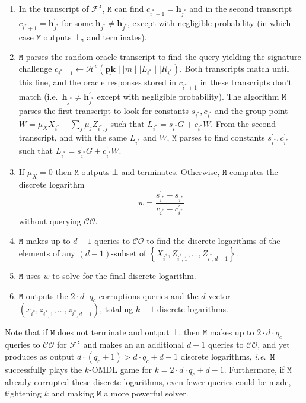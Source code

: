 \documentclass{mrl}
\theoremstyle{plain}
\theoremstyle{definition}
\begin{document}
\begin{enumerate}
\item In the transcript of $\mathcal{F}^{\texttt{A}}$, $\texttt{M}$ can find $c_{i^*+1} = \textbf{h}_{j^*}$ and in the second transcript $c_{i^*+1} = \textbf{h}^\prime_{j^*}$ for some $\textbf{h}_{j^*} \neq \textbf{h}^\prime_{j^*}$, except with negligible probability (in which case $\texttt{M}$ outputs $\bot_{\texttt{M}}$ and terminates).

\item $\texttt{M}$ parses the random oracle transcript to find the query yielding the signature challenge  $c_{i^*+1} \leftarrow \mathcal{H}^s(\underline{\textbf{pk}} \mid \mid m \mid \mid L_{i^*} \mid \mid R_{i^*})$. Both transcripts match until this line, and the oracle responses stored in $c_{i^*+1}$ in these transcripts don't match (i.e.\ $\textbf{h}_{j^*} \neq \textbf{h}^\prime_{j^*}$ except with negligible probability). The algorithm  $\texttt{M}$ parses the first transcript to look for constants $s_{i^*}, c_{i^*}$ and the group point $W = \mu_X X_{i^*} + \sum_j \mu_j Z_{i^*, j}$ such that $L_{i^*} = s_{i^*} G + c_{i^*} W$. From the second transcript, and with the same $L_{i^*}$ and $W$, $\texttt{M}$ parses to find constants $s_{i^*}^\prime, c_{i^*}^\prime$ such that $L_{i^*} = s_{i^*}^\prime G + c_{i^*}^\prime W$.

\item If $\mu_X = 0$ then $\texttt{M}$ outputs $\bot$ and terminates. Otherwise, $\texttt{M}$ computes the discrete logarithm
$$w = \frac{s_{i^*}^\prime - s_{i^*}}{c_{i^*} - c_{i^*}^\prime}$$ without querying $\mathcal{CO}$.

\item $\texttt{M}$ makes up to $d-1$ queries to $\mathcal{CO}$ to find the discrete logarithms of the elements of any $(d-1)$-subset of $\left\{X_{i^*}, Z_{i^*, 1}, \ldots, Z_{i^*, d-1}\right\}$.

\item $\texttt{M}$ uses $w$ to solve for the final discrete logarithm. 

\item $\texttt{M}$ outputs the $2 \cdot d \cdot q_c$ corruptions queries and the $d$-vector $(x_{i^*}, z_{i^*, 1}, \ldots, z_{i^*, d-1})$, totaling $k+1$ discrete logarithms.
\end{enumerate}

Note that if $\texttt{M}$ does not terminate and output $\bot$, then $\texttt{M}$ makes up to $2\cdot d \cdot q_c$ queries to $\mathcal{CO}$ for $\mathcal{F}^{\texttt{A}}$ and makes an an additional $d-1$ queries to $\mathcal{CO}$, and yet produces as output $d \cdot (q_c + 1) > d \cdot q_c + d-1$ discrete logarithms, \textit{i.e.}\ $\texttt{M}$ successfully plays the $k$-OMDL game for $k = 2\cdot d\cdot q_c + d-1$. Furthermore,  if $\texttt{M}$ already corrupted these discrete logarithms, even fewer queries could be made, tightening $k$ and making $\texttt{M}$ a more powerful solver. 
\end{document}
